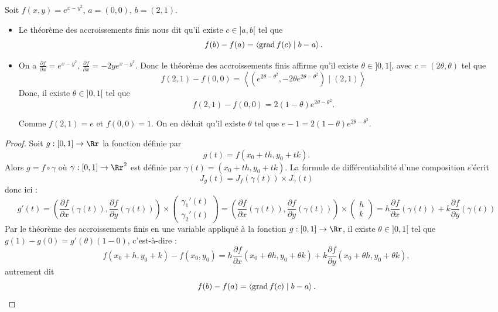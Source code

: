 \documentclass[12pt, class=report,crop=false]{standalone}
\begin{document}
\begin{exemple}
Soit $f(x,y) = e^{x-y^2}$, $a = (0,0)$, $b=(2,1)$.
\begin{itemize} 
  \item Le théorème des accroissements finis nous dit qu'il existe $c \in ]a,b[$ tel que 
$$f(b)-f(a) = \left\langle \operatorname{grad} f (c) \mid b-a \right\rangle.$$

  \item On a   $\frac{\partial f}{\partial x} = e^{x-y^2}$, 
$\frac{\partial f}{\partial x} = -2ye^{x-y^2}$.
  Donc le théorème des accroissements finis affirme qu'il existe $\theta \in ]0,1[$, avec $c = (2\theta,\theta)$ tel que
  $$f(2,1)-f(0,0) = \left\langle (e^{2\theta-\theta^2},-2\theta e^{2\theta-\theta^2}) \mid (2,1) \right\rangle$$
Donc, il existe  $\theta \in ]0,1[$ tel que
 $$f(2,1)-f(0,0) = 2(1-\theta)e^{2\theta-\theta^2}.$$
  
Comme $f(2,1) = e$ et $f(0,0)=1$. On en déduit qu'il existe $\theta$ tel que $e-1= 2(1-\theta)e^{2\theta-\theta^2}$.
  
\end{itemize}


\end{exemple}

\begin{proof}
Soit $g : [0,1] \to \Rr$ la fonction définie par 
$$g(t) = f(x_0+th,y_0+tk).$$
Alors $g = f \circ \gamma$ où $\gamma : [0,1] \to \Rr^2$ est définie par $\gamma(t) = (x_0+th,y_0+tk)$.
La formule de différentiabilité d'une composition s'écrit 
$$J_g(t) = J_f (\gamma(t)) \times J_\gamma(t)$$
donc ici :
$$g'(t) = \left(\frac{\partial f}{\partial x}(\gamma(t)),
\frac{\partial f}{\partial y}(\gamma(t)) \right) \times 
\begin{pmatrix}
\gamma_1'(t)\\
\gamma_2'(t)
\end{pmatrix}
= \left(\frac{\partial f}{\partial x}(\gamma(t)),
\frac{\partial f}{\partial y}(\gamma(t)) \right) \times 
\begin{pmatrix}
h\\
k 
\end{pmatrix}
= h\frac{\partial f}{\partial x}(\gamma(t)) + k  \frac{\partial f}{\partial y}(\gamma(t))$$
Par le théorème des accroissements finis en une variable appliqué à la fonction $g : [0,1] \to \Rr$, il existe $\theta \in ]0,1[$ tel que $g(1)-g(0) = g'(\theta)(1-0)$, c'est-à-dire :
$$f(x_0+h,y_0+k) - f(x_0,y_0) = h\frac{\partial f}{\partial x}(x_0+\theta h,y_0+\theta k)
+k\frac{\partial f}{\partial y}(x_0+\theta h,y_0+\theta k),$$ 
autrement dit
$$f(b)-f(a) = \left\langle \operatorname{grad} f (c) \mid b-a \right\rangle.$$
\end{proof}
\end{document}
